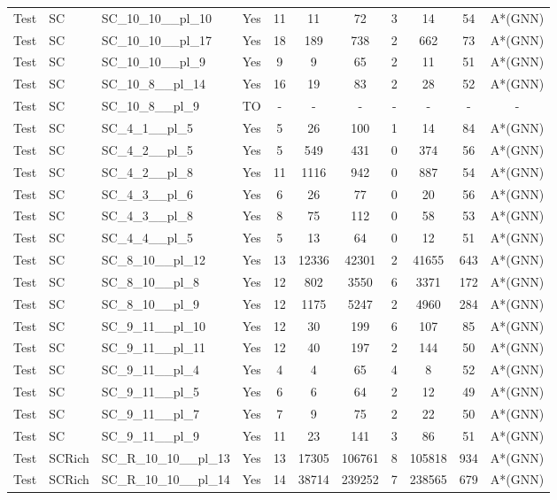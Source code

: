 \documentclass{article}
\begin{document}
\begin{tabular}{lllcccccccc}
Test & SC & SC\_10\_10\_\_pl\_10 & Yes & 11 & 11 & 72 & 3 & 14 & 54 & A*(GNN) \\
Test & SC & SC\_10\_10\_\_pl\_17 & Yes & 18 & 189 & 738 & 2 & 662 & 73 & A*(GNN) \\
Test & SC & SC\_10\_10\_\_pl\_9 & Yes & 9 & 9 & 65 & 2 & 11 & 51 & A*(GNN) \\
Test & SC & SC\_10\_8\_\_pl\_14 & Yes & 16 & 19 & 83 & 2 & 28 & 52 & A*(GNN) \\
Test & SC & SC\_10\_8\_\_pl\_9 & TO & - & - & - & - & - & - & - \\
Test & SC & SC\_4\_1\_\_pl\_5 & Yes & 5 & 26 & 100 & 1 & 14 & 84 & A*(GNN) \\
Test & SC & SC\_4\_2\_\_pl\_5 & Yes & 5 & 549 & 431 & 0 & 374 & 56 & A*(GNN) \\
Test & SC & SC\_4\_2\_\_pl\_8 & Yes & 11 & 1116 & 942 & 0 & 887 & 54 & A*(GNN) \\
Test & SC & SC\_4\_3\_\_pl\_6 & Yes & 6 & 26 & 77 & 0 & 20 & 56 & A*(GNN) \\
Test & SC & SC\_4\_3\_\_pl\_8 & Yes & 8 & 75 & 112 & 0 & 58 & 53 & A*(GNN) \\
Test & SC & SC\_4\_4\_\_pl\_5 & Yes & 5 & 13 & 64 & 0 & 12 & 51 & A*(GNN) \\
Test & SC & SC\_8\_10\_\_pl\_12 & Yes & 13 & 12336 & 42301 & 2 & 41655 & 643 & A*(GNN) \\
Test & SC & SC\_8\_10\_\_pl\_8 & Yes & 12 & 802 & 3550 & 6 & 3371 & 172 & A*(GNN) \\
Test & SC & SC\_8\_10\_\_pl\_9 & Yes & 12 & 1175 & 5247 & 2 & 4960 & 284 & A*(GNN) \\
Test & SC & SC\_9\_11\_\_pl\_10 & Yes & 12 & 30 & 199 & 6 & 107 & 85 & A*(GNN) \\
Test & SC & SC\_9\_11\_\_pl\_11 & Yes & 12 & 40 & 197 & 2 & 144 & 50 & A*(GNN) \\
Test & SC & SC\_9\_11\_\_pl\_4 & Yes & 4 & 4 & 65 & 4 & 8 & 52 & A*(GNN) \\
Test & SC & SC\_9\_11\_\_pl\_5 & Yes & 6 & 6 & 64 & 2 & 12 & 49 & A*(GNN) \\
Test & SC & SC\_9\_11\_\_pl\_7 & Yes & 7 & 9 & 75 & 2 & 22 & 50 & A*(GNN) \\
Test & SC & SC\_9\_11\_\_pl\_9 & Yes & 11 & 23 & 141 & 3 & 86 & 51 & A*(GNN) \\
Test & SCRich & SC\_R\_10\_10\_\_pl\_13 & Yes & 13 & 17305 & 106761 & 8 & 105818 & 934 & A*(GNN) \\
Test & SCRich & SC\_R\_10\_10\_\_pl\_14 & Yes & 14 & 38714 & 239252 & 7 & 238565 & 679 & A*(GNN) \\

\end{tabular}
\end{document}
